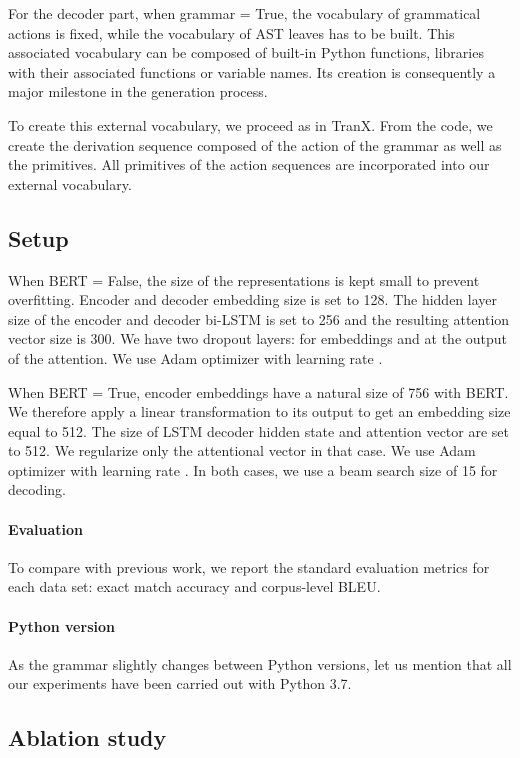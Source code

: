 \documentclass[11pt]{article}
\newcommand{\var}{\sc}
\begin{document}
For the decoder part, when {\var grammar = True}, the vocabulary of grammatical actions is fixed, while the vocabulary of AST leaves has to be built. This associated vocabulary can be composed of built-in Python functions, libraries with their associated functions or variable names. Its creation is consequently a major milestone in the generation process. 

To create this external vocabulary, we proceed as in {\selectfont TranX}. From the code, we create the derivation sequence composed of the action of the grammar as well as the primitives. All primitives of the action sequences are incorporated into our external vocabulary. 


\subsection{Setup}

When {\var BERT = False}, the size of the representations is kept small to prevent overfitting. Encoder and decoder embedding size is set to 128. The hidden layer size of the encoder and decoder bi-LSTM is set to 256 and the resulting attention vector size is 300.   
We have two dropout layers: for embeddings and at the output of the attention.  We use Adam optimizer with learning rate .

When {\var BERT = True}, encoder embeddings have a natural size of 756 with BERT. We therefore apply a linear transformation to its output to get an embedding size equal to 512. The size of LSTM decoder hidden state and attention vector are set to 512. We regularize only the attentional vector in that case. We use Adam optimizer with learning rate . In both cases, we use a beam search size of 15 for decoding. 

\paragraph{Evaluation} To compare with previous work, we report the standard evaluation metrics for each data set: exact match accuracy and corpus-level BLEU. 

\paragraph{Python version} As the grammar slightly changes between Python versions, let us mention that all our experiments have been carried out with Python 3.7.


\subsection{Ablation study} 
\label{Ablation}
\end{document}
